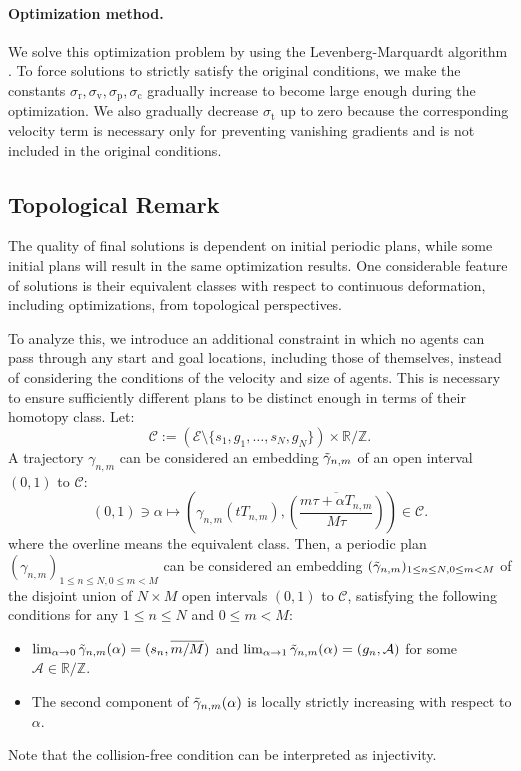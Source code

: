 \documentclass[letterpaper]{article} %
\begin{document}
\paragraph{Optimization method.}
We solve this optimization problem by using the Levenberg-Marquardt algorithm \cite{levenberg1944method,marquardt1963algorithm}. To force solutions to strictly satisfy the original conditions, we make the constants $\sigma_{\mathrm{r}}, \sigma_{\mathrm{v}}, \sigma_{\mathrm{p}}, \sigma_{\mathrm{c}}$ gradually increase to become large enough during the optimization. We also gradually decrease $\sigma_{\mathrm{t}}$ up to zero because the corresponding velocity term is necessary only for preventing vanishing gradients and is not included in the original conditions.

\subsection{Topological Remark} The quality of final solutions is dependent on initial periodic plans, while some initial plans will result in the same optimization results. One considerable feature of solutions is their equivalent classes with respect to continuous deformation, including optimizations, from topological perspectives.

To analyze this, we introduce an additional constraint in which no agents can pass through any start and goal locations, including those of themselves, instead of considering the conditions of the velocity and size of agents. This is necessary to ensure sufficiently different plans to be distinct enough in terms of their homotopy class. Let:
\begin{equation}
\mathcal{C}:=(\mathcal{E}\setminus\{s_1, g_1,\ldots, s_N, g_N\})\times \mathbb{R}/\mathbb{Z}.
\end{equation}
A trajectory $\gamma_{n,m}$ can be considered an embedding $\Tilde{\gamma}_{n,m}$ of an open interval $(0,1)$ to $\mathcal{C}$:
\begin{equation}
    (0,1) \ni \alpha \mapsto \left(\gamma_{n,m}(tT_{n,m}), \overline{\left(\frac{m\tau+\alpha T_{n,m}}{M\tau}\right)}\right)\in \mathcal{C}.
\end{equation}
where the overline means the equivalent class. Then, a periodic plan $(\gamma_{n,m})_{1\leq n\leq N, 0\leq m <M}$ can be considered an embedding $(\Tilde{\gamma}_{n,m})_{1\leq n\leq N, 0\leq m <M}$ of the disjoint union of $N\times M$ open intervals $(0,1)$ to $\mathcal{C}$, satisfying the following conditions for any $1\leq n \leq N$ and $0 \leq m < M$:
\begin{itemize}
    \item $\lim_{\alpha\rightarrow 0}\Tilde{\gamma}_{n,m}(\alpha)=(s_n, \overline{m/M})$ and $\lim_{\alpha\rightarrow 1}\Tilde{\gamma}_{n,m}(\alpha)=(g_n, \mathcal{A})$ for some $\mathcal{A}\in \mathbb{R}/\mathbb{Z}$.
    \item The second component of $\Tilde{\gamma}_{n,m}(\alpha)$ is locally strictly increasing with respect to $\alpha$.
\end{itemize}
Note that the collision-free condition can be interpreted as injectivity.
\end{document}
